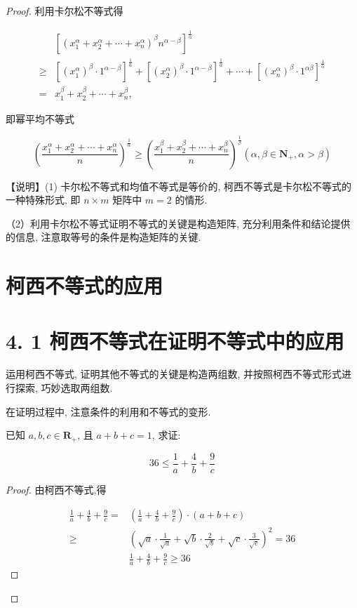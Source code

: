 \begin{proof}
	利用卡尔松不等式得
	
	$$
	\begin{aligned}
	& {\left[\left(x_{1}^{\alpha}+x_{2}^{\alpha}+\cdots+x_{n}^{\alpha}\right)^{\beta} n^{\alpha-\beta}\right]^{\frac{1}{\alpha}} } \\
	\geqslant & {\left[\left(x_{1}^{\alpha}\right)^{\beta} \cdot 1^{\alpha-\beta}\right]^{\frac{1}{\alpha}}+\left[\left(x_{2}^{\alpha}\right)^{\beta} \cdot 1^{\alpha-\beta}\right]^{\frac{1}{\alpha}}+\cdots+\left[\left(x_{n}^{\alpha}\right)^{\beta} \cdot 1^{\alpha \beta}\right]^{\frac{1}{\alpha}} } \\
	= & x_{1}^{\beta}+x_{2}^{\beta}+\cdots+x_{n}^{\beta},
	\end{aligned}
	$$
	
	即幂平均不等式
	
	$$
	\left(\frac{x_{1}^{\alpha}+x_{2}^{\alpha}+\cdots+x_{n}^{\alpha}}{n}\right)^{\frac{1}{\alpha}} \geqslant\left(\frac{x_{1}^{\beta}+x_{2}^{\beta}+\cdots+x_{n}^{\beta}}{n}\right)^{\frac{1}{\beta}}\left(\alpha, \beta \in \mathbf{N}_{+}, \alpha>\beta\right)
	$$
	
	【说明】(1) 卡尔松不等式和均值不等式是等价的, 柯西不等式是卡尔松不等式的一种特殊形式, 即 $n \times m$ 矩阵中 $m=2$ 的情形.
	
	（2）利用卡尔松不等式证明不等式的关键是构造矩阵, 充分利用条件和结论提供的信息, 注意取等号的条件是构造矩阵的关键.
	

	\section*{柯西不等式的应用}
	\section*{4. 1 柯西不等式在证明不等式中的应用}
	运用柯西不等式, 证明其他不等式的关键是构造两组数, 并按照柯西不等式形式进行探索, 巧妙选取两组数.

\begin{note}
	在证明过程中, 注意条件的利用和不等式的变形.
\end{note}

\begin{example}
	已知 $a, b, c \in \mathbf{R}_{+}$, 且 $a+b+c=1$, 求证:
	
	$$
	36 \leqslant \frac{1}{a}+\frac{4}{b}+\frac{9}{c}
	$$
\end{example}
\begin{proof}
	由柯西不等式,得
	
	$$
	\begin{aligned}
	\frac{1}{a}+\frac{4}{b}+\frac{9}{c}= & \left(\frac{1}{a}+\frac{4}{b}+\frac{9}{c}\right) \cdot(a+b+c) \\
	\geqslant & \left(\sqrt{a} \cdot \frac{1}{\sqrt{a}}+\sqrt{b} \cdot \frac{2}{\sqrt{b}}+\sqrt{c} \cdot \frac{3}{\sqrt{c}}\right)^{2}=36 \\
	& \frac{1}{a}+\frac{4}{b}+\frac{9}{c} \geqslant 36
	\end{aligned}
	$$
	

\end{proof}
\end{proof}
